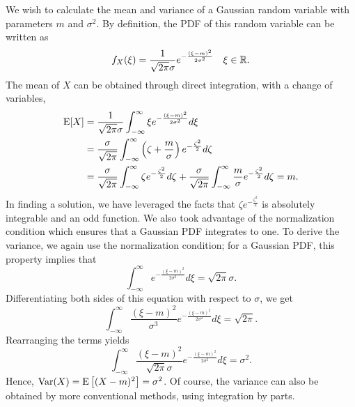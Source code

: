 \begin{example}
We wish to calculate the mean and variance of a Gaussian random variable with parameters $m$ and $\sigma^2$.
By definition, the PDF of this random variable can be written as
\begin{equation*}
f_X (\xi) = \frac{1}{\sqrt{2 \pi} \sigma} e^{-\frac{(\xi - m)^2}{2\sigma^2}}
\quad \xi \in \mathbb{R} .
\end{equation*}
The mean of $X$ can be obtained through direct integration, with a change of variables,
\begin{equation*}
\begin{split}
\mathrm{E} [X]
&= \frac{1}{\sqrt{2 \pi} \sigma} \int_{- \infty}^{\infty} \xi e^{-\frac{(\xi-m)^2}{2\sigma^2}} d\xi \\
&= \frac{\sigma}{\sqrt{2 \pi}} \int_{- \infty}^{\infty}
\left( \zeta+\frac{m}{\sigma} \right) e^{-\frac{\zeta^2}{2}} d\zeta \\
&= \frac{\sigma}{\sqrt{2 \pi}} \int_{- \infty}^{\infty}
\zeta e^{-\frac{\zeta^2}{2}} d\zeta
+ \frac{\sigma}{\sqrt{2 \pi}} \int_{- \infty}^{\infty}
\frac{m}{\sigma} e^{-\frac{\zeta^2}{2}} d\zeta
= m.
\end{split}
\end{equation*}
In finding a solution, we have leveraged the facts that $\zeta e^{-\frac{\zeta^2}{2}}$ is absolutely integrable and an odd function.
We also took advantage of the normalization condition which ensures that a Gaussian PDF integrates to one.
To derive the variance, we again use the normalization condition; for a Gaussian PDF, this property implies that
\begin{equation*}
\int_{-\infty}^{\infty} e^{- \frac{(\xi-m)^2}{2 \sigma^2}} d\xi
= \sqrt{2 \pi} \sigma .
\end{equation*}
Differentiating both sides of this equation with respect to $\sigma$, we get
\begin{equation*}
\int_{-\infty}^{\infty} \frac{(\xi-m)^2}{\sigma^3}
e^{- \frac{(\xi-m)^2}{2 \sigma^2}} d\xi
= \sqrt{2 \pi} .
\end{equation*}
Rearranging the terms yields
\begin{equation*}
\int_{-\infty}^{\infty} \frac{(\xi-m)^2}{\sqrt{2 \pi} \sigma}
e^{- \frac{(\xi-m)^2}{2 \sigma^2}} d\xi
= \sigma^2 .
\end{equation*}
Hence, $\mathrm{Var}(X) = \mathrm{E} \left[ (X-m)^2 \right] = \sigma^2$.
Of course, the variance can also be obtained by more conventional methods, using integration by parts.
\end{example}


